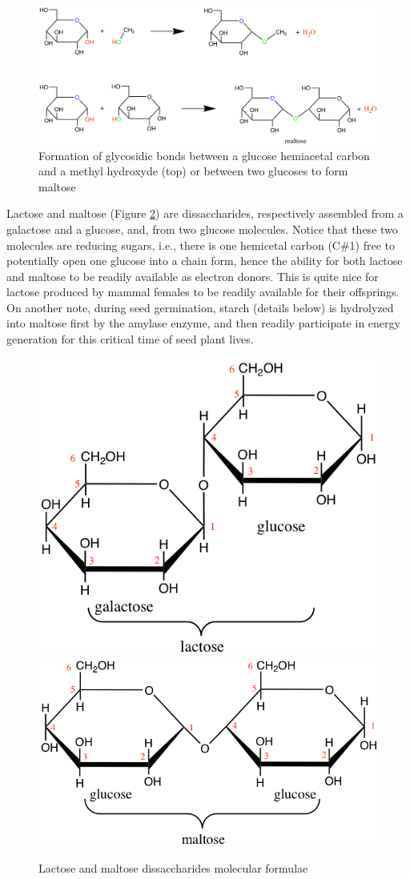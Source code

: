 \documentclass[]{book}
\theoremstyle{definition}
\theoremstyle{definition}
\theoremstyle{definition}
\theoremstyle{remark}
\begin{document}
\begin{figure}

{\centering \includegraphics[width=1\linewidth]{pictures/O-maltose-glycosidic-bond} 

}

\caption{Formation of glycosidic bonds between a glucose hemiacetal carbon and a methyl hydroxyde (top) or between two glucoses to form maltose}\label{fig:O-maltose-glycosidic-bond}
\end{figure}

Lactose and maltose (Figure \ref{fig:lactose-maltose}) are
dissaccharides, respectively assembled from a galactose and a glucose,
and, from two glucose molecules. Notice that these two molecules are
reducing sugars, i.e., there is one hemicetal carbon (C\#1) free to
potentially open one glucose into a chain form, hence the ability for
both lactose and maltose to be readily available as electron donors.
This is quite nice for lactose produced by mammal females to be readily
available for their offsprings. On another note, during seed
germination, starch (details below) is hydrolyzed into maltose first by
the amylase enzyme, and then readily participate in energy generation
for this critical time of seed plant lives.

\begin{figure}

{\centering \includegraphics[width=0.48\linewidth]{pictures/lactose} \includegraphics[width=0.48\linewidth]{pictures/maltose} 

}

\caption{Lactose and maltose dissaccharides molecular formulae }\label{fig:lactose-maltose}
\end{figure}
\end{document}
